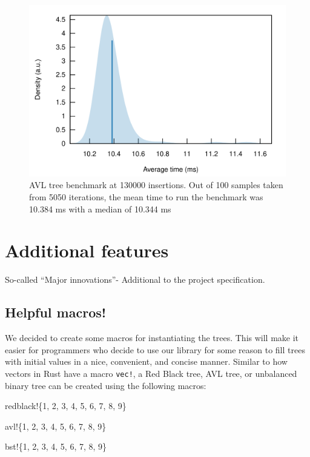\documentclass[letterpaper]{article}
\begin{document}
\begin{figure}[H]
      \centering
      \includegraphics[width=.8\textwidth]{avlbeeg.png}
      \caption{AVL tree benchmark at 130000 insertions. Out of 100 samples
      taken from 5050 iterations, the mean time to run the benchmark was 10.384
    ms with a median of 10.344 ms}
\end{figure}

\section{Additional features}
So-called ``Major innovations''- Additional to the project specification.

\subsection{Helpful macros!}
We decided to create some macros for instantiating the trees.  This will make it
easier for programmers who decide to use our library for some reason to fill
trees with initial values in a nice, convenient, and concise manner.  
Similar to how vectors in Rust have a macro \texttt{vec!}, a Red Black tree,
AVL tree, or unbalanced binary tree can be created using the
following macros:

\begin{texttt}
  redblack!\{1, 2, 3, 4, 5, 6, 7, 8, 9\}
\end{texttt}

\begin{texttt}
  avl!\{1, 2, 3, 4, 5, 6, 7, 8, 9\}
\end{texttt}

\begin{texttt}
  bst!\{1, 2, 3, 4, 5, 6, 7, 8, 9\}
\end{texttt}
\end{document}
